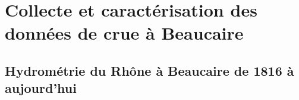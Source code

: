 %
% 
%
%
%
%
%
%


\chapter{Collecte et caractérisation des données de crue à Beaucaire}

\section{Hydrométrie du Rhône à Beaucaire de 1816 à aujourd'hui}
\label{sec:hydrometrie}

